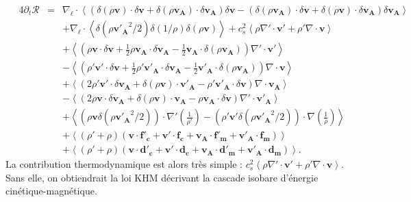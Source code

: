 \begin{eqnarray}
\label{eq:turb_isot_khm3}\quad 4\partial_t \mathcal{R} &=& \nabla_{\boldsymbol{\ell}} \cdot \left<\left(\delta \left(\rho\boldsymbol{v}\right) \cdot \delta \boldsymbol{v}+ \delta \left(\rho\boldsymbol{v_A}\right) \cdot \delta \boldsymbol{v_A}\right) \delta \boldsymbol{v}  -\left(\delta \left(\rho\boldsymbol{v_A}\right) \cdot \delta \boldsymbol{v}  + \delta \left(\rho\boldsymbol{v}\right) \cdot \delta \boldsymbol{v_A}  \right) \delta \boldsymbol{v_A} \right>\nonumber\\
&& + \nabla_{\boldsymbol{\ell}} \cdot \left<  \delta \left(\rho\boldsymbol{v'_A}^2/2\right)  \delta \left(1/\rho\right) \delta\left(\rho \boldsymbol{v}\right) \right> + c^2_s\left<  \rho \nabla' \cdot \boldsymbol{v'} +\rho'\nabla \cdot \boldsymbol{v}\right>\nonumber\\
&& +\left< \left(\rho \boldsymbol{v} \cdot \delta \boldsymbol{v} +\frac{1}{2} \rho \boldsymbol{v_A} \cdot \delta \boldsymbol{v_A} -\frac{1}{2} \boldsymbol{v_A} \cdot \delta \left(\rho \boldsymbol{v_A}\right)\right) \nabla' \cdot \boldsymbol{v'} \right>\nonumber\\
&& -\left<\left( \rho' \boldsymbol{v'} \cdot \delta \boldsymbol{v} +\frac{1}{2} \rho' \boldsymbol{v'_A} \cdot \delta \boldsymbol{v_A} -\frac{1}{2} \boldsymbol{v'_A} \cdot \delta \left(\rho \boldsymbol{v_A}\right)\right) \nabla \cdot \boldsymbol{v} \right>\nonumber\\
&&+ \left<\left(2 \rho' \boldsymbol{v'} \cdot \delta \boldsymbol{v_A}+ \delta\left(\rho \boldsymbol{v}\right) \cdot \boldsymbol{v'_A} - \rho' \boldsymbol{v'_A} \cdot \delta \boldsymbol{v}  \right)\nabla \cdot \boldsymbol{v_A}\right>\nonumber\\
&&- \left<\left(2\rho \boldsymbol{v} \cdot \delta \boldsymbol{v_A} + \delta\left(\rho \boldsymbol{v}\right) \cdot \boldsymbol{v_A} - \rho \boldsymbol{v_A} \cdot \delta \boldsymbol{v}  \right)\nabla' \cdot \boldsymbol{v'_A}\right> \nonumber\\
&&+ \left< \left(\rho\boldsymbol{v} \delta \left(\rho\boldsymbol{v'_A}^2/2\right) \right) \cdot \nabla'\left(\frac{1}{\rho'}\right) - \left(\rho' \boldsymbol{v'}\delta \left(\rho\boldsymbol{v'_A}^2/2\right) \right) \cdot \nabla \left(\frac{1}{\rho}\right)\right>\nonumber\\
&&+  \left<\left(\rho' + \rho\right)\left(\boldsymbol{v} \cdot \boldsymbol{f'_c} + \boldsymbol{v'} \cdot \boldsymbol{f_c} + \boldsymbol{v_A} \cdot \boldsymbol{f'_m} + \boldsymbol{v'_A} \cdot \boldsymbol{f_m}\right) \right>\nonumber\\
&&+ \left<\left(\rho' + \rho\right)\left(\boldsymbol{v} \cdot \boldsymbol{d'_c} + \boldsymbol{v'} \cdot \boldsymbol{d_c}+\boldsymbol{v_A} \cdot \boldsymbol{d'_m} + \boldsymbol{v'_A} \cdot \boldsymbol{d_m}\right)\right> .
\end{eqnarray}
La contribution thermodynamique est alors très simple : $ c^2_s \left< \rho \nabla' \cdot \boldsymbol{v'} +\rho'\nabla \cdot \boldsymbol{v} \right>$. Sans elle, on obtiendrait la loi \acs{KHM} décrivant la cascade isobare d'énergie cinétique-magnétique.  

